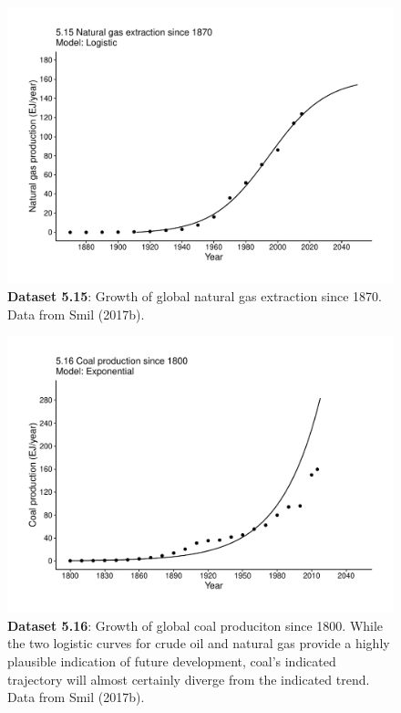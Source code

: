 \documentclass[aps,rmp,preprint,superscriptaddress,10pt,onecolumn]{article}
\begin{document}
\clearpage
\begin{figure}[h]
\includegraphics[width=\textwidth]{output/figs-ggplot/5.15.pdf}
\caption{\textbf{Dataset 5.15}: Growth of global natural gas extraction since 1870. Data from Smil (2017b).}
\end{figure}
	
\clearpage
\begin{figure}[h]
\includegraphics[width=\textwidth]{output/figs-ggplot/5.16.pdf}
\caption{\textbf{Dataset 5.16}: Growth of global coal produciton since 1800. While the two logistic curves for crude oil and natural gas provide a highly plausible indication of future development, coal's indicated trajectory will almost certainly diverge from the indicated trend. Data from Smil (2017b). }
\end{figure}
	
\end{document}
